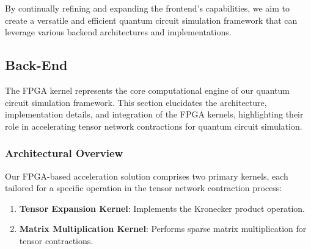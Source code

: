 \documentclass[12pt,oneside,a4paper]{article}
\begin{document}
By continually refining and expanding the frontend's capabilities, we aim to create a versatile and efficient quantum circuit simulation framework that can leverage various backend architectures and implementations.


\subsection{Back-End}



The FPGA kernel represents the core computational engine of our quantum circuit simulation framework. This section elucidates the architecture, implementation details, and integration of the FPGA kernels, highlighting their role in accelerating tensor network contractions for quantum circuit simulation.

\subsubsection{Architectural Overview}

Our FPGA-based acceleration solution comprises two primary kernels, each tailored for a specific operation in the tensor network contraction process:

\begin{enumerate}
    \item \textbf{Tensor Expansion Kernel}: Implements the Kronecker product operation.
    \item \textbf{Matrix Multiplication Kernel}: Performs sparse matrix multiplication for tensor contractions.
\end{enumerate}
\end{document}
